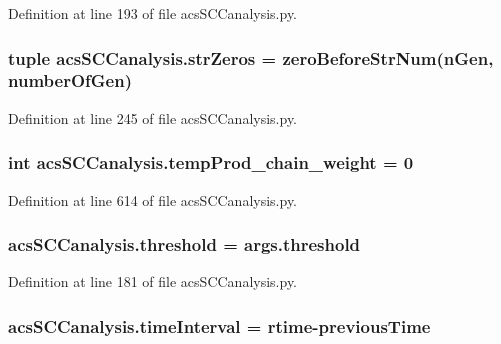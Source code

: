 Definition at line 193 of file acs\-S\-C\-Canalysis.\-py.

\hypertarget{a00097_a8ba6aefb71b3d1e575eac38627f143d6}{
\subsubsection[{str\-Zeros}]{\setlength{\rightskip}{0pt plus 5cm}tuple acs\-S\-C\-Canalysis.\-str\-Zeros = {\bf zero\-Before\-Str\-Num}(n\-Gen, {\bf number\-Of\-Gen})}}\label{a00097_a8ba6aefb71b3d1e575eac38627f143d6}


Definition at line 245 of file acs\-S\-C\-Canalysis.\-py.

\hypertarget{a00097_aaf17c99825e0961e4cfaa173ddfffe84}{
\subsubsection[{temp\-Prod\-\_\-chain\-\_\-weight}]{\setlength{\rightskip}{0pt plus 5cm}int acs\-S\-C\-Canalysis.\-temp\-Prod\-\_\-chain\-\_\-weight = 0}}\label{a00097_aaf17c99825e0961e4cfaa173ddfffe84}


Definition at line 614 of file acs\-S\-C\-Canalysis.\-py.

\hypertarget{a00097_ae1fe4f15ea3fbcf05be2c82cd6f80307}{
\subsubsection[{threshold}]{\setlength{\rightskip}{0pt plus 5cm}acs\-S\-C\-Canalysis.\-threshold = args.\-threshold}}\label{a00097_ae1fe4f15ea3fbcf05be2c82cd6f80307}


Definition at line 181 of file acs\-S\-C\-Canalysis.\-py.

\hypertarget{a00097_a7d0f86310c439e970e0b41121364027c}{
\subsubsection[{time\-Interval}]{\setlength{\rightskip}{0pt plus 5cm}acs\-S\-C\-Canalysis.\-time\-Interval = {\bf rtime}-\/{\bf previous\-Time}}}\label{a00097_a7d0f86310c439e970e0b41121364027c}


